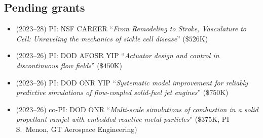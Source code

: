 \subsection{Pending grants}

\begin{itemize}
    \item (2023--28) PI: NSF CAREER ``\textit{From Remodeling to Stroke, Vasculature to Cell: Unraveling the mechanics of sickle cell disease}'' ($\$526$K)
    \item (2023--26) PI: DOD AFOSR YIP ``\textit{Actuator design and control in discontinuous flow fields}'' ($\$450$K)
    \item (2023--26) PI: DOD ONR YIP ``\textit{Systematic model improvement for reliably predictive simulations of flow-coupled solid-fuel jet engines}'' ($\$750$K)
    \item (2023--26) co-PI: DOD ONR ``\textit{Multi-scale simulations of combustion in a solid propellant ramjet with embedded reactive metal particles}'' ($\$375$K, PI S.\ Menon, GT Aerospace Engineering)
\end{itemize}
